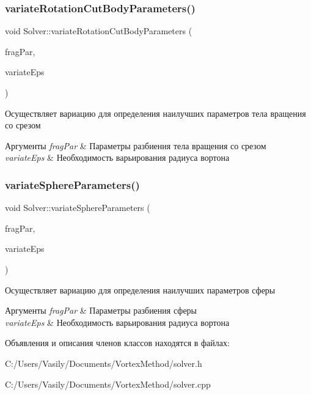 \subsubsection{\texorpdfstring{variate\+Rotation\+Cut\+Body\+Parameters()}{variateRotationCutBodyParameters()}}
{\footnotesize\ttfamily void Solver\+::variate\+Rotation\+Cut\+Body\+Parameters (\begin{DoxyParamCaption}\item[{\mbox{\hyperlink{struct_fragmentation_parameters}{Fragmentation\+Parameters}}}]{frag\+Par,  }\item[{bool}]{variate\+Eps }\end{DoxyParamCaption})}

Осуществляет вариацию для определения наилучших параметров тела вращения со срезом 
\begin{DoxyParams}{Аргументы}
{\em frag\+Par} & Параметры разбиения тела вращения со срезом \\
\hline
{\em variate\+Eps} & Необходимость варьирования радиуса вортона \\
\hline
\end{DoxyParams}
\mbox{\label{class_solver_aa62532c15197fb20b689f8f20e51a187}} 
\subsubsection{\texorpdfstring{variate\+Sphere\+Parameters()}{variateSphereParameters()}}
{\footnotesize\ttfamily void Solver\+::variate\+Sphere\+Parameters (\begin{DoxyParamCaption}\item[{\mbox{\hyperlink{struct_fragmentation_parameters}{Fragmentation\+Parameters}}}]{frag\+Par,  }\item[{bool}]{variate\+Eps }\end{DoxyParamCaption})}

Осуществляет вариацию для определения наилучших параметров сферы 
\begin{DoxyParams}{Аргументы}
{\em frag\+Par} & Параметры разбиения сферы \\
\hline
{\em variate\+Eps} & Необходимость варьирования радиуса вортона \\
\hline
\end{DoxyParams}


Объявления и описания членов классов находятся в файлах\+:\begin{DoxyCompactItemize}
\item 
C\+:/\+Users/\+Vasily/\+Documents/\+Vortex\+Method/solver.\+h\item 
C\+:/\+Users/\+Vasily/\+Documents/\+Vortex\+Method/solver.\+cpp\end{DoxyCompactItemize}
